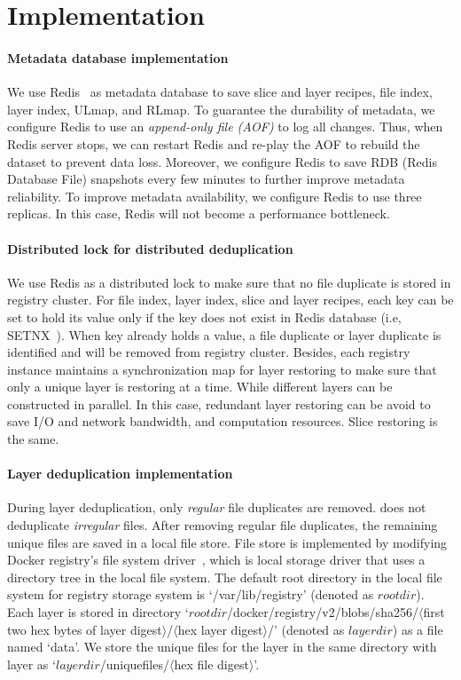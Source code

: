 \section{Implementation}
\label{sec:impl}

\paragraph{Metadata database implementation}
We use Redis~\cite{xxx} as metadata database to save slice and layer recipes, file index, layer index, ULmap, and RLmap.
To guarantee the durability of metadata, 
we configure Redis to use an \emph{append-only file (AOF)} to log all changes.
Thus, when Redis server stops, we can restart Redis and re-play the AOF to rebuild the dataset to prevent data loss.
Moreover, we configure Redis to save RDB (Redis Database File) snapshots every few minutes to further improve metadata reliability. 
To improve metadata availability, 
we configure Redis to use three replicas.
In this case, Redis will not become a performance bottleneck.

\paragraph{Distributed lock for distributed deduplication}
We use Redis as a distributed lock to make sure that no file duplicate is stored in registry cluster.
For file index, layer index, slice and layer recipes, each key can be set to hold its value only if the key does not exist in Redis database (i.e, SETNX~\cite{xxx}).
When key already holds a value, a file duplicate or layer duplicate is identified and will be removed from registry cluster.
 Besides, 
 each registry instance maintains a  synchronization map for layer restoring to make sure that only a unique layer is restoring at a time.
 While different layers can be constructed in parallel. 
 In this case, redundant layer restoring can be avoid to save I/O and network bandwidth, and computation resources.
 Slice restoring is the same.

\paragraph{Layer deduplication implementation}
During layer deduplication, only \emph{regular} file duplicates are removed.
\sysname does not deduplicate \emph{irregular} files.
After removing regular file duplicates, the remaining unique files are saved in a local file store.
File store is implemented by modifying Docker registry's file system driver~\cite{xxx}, 
which is local storage driver 
that uses a directory tree in the local file system.
The default root directory in the local file system for registry storage system is `/var/lib/registry' (denoted as $rootdir$).
Each layer is stored in directory `$rootdir$/docker/registry/v2/blobs/sha256/$\langle$first two hex bytes of layer digest$\rangle$/$\langle$hex layer digest$\rangle$/' (denoted as $layerdir$) as a file named `data'.
We store the unique files for the layer in the same directory with layer as `$layerdir$/uniquefiles/$\langle$hex file digest$\rangle$'.

